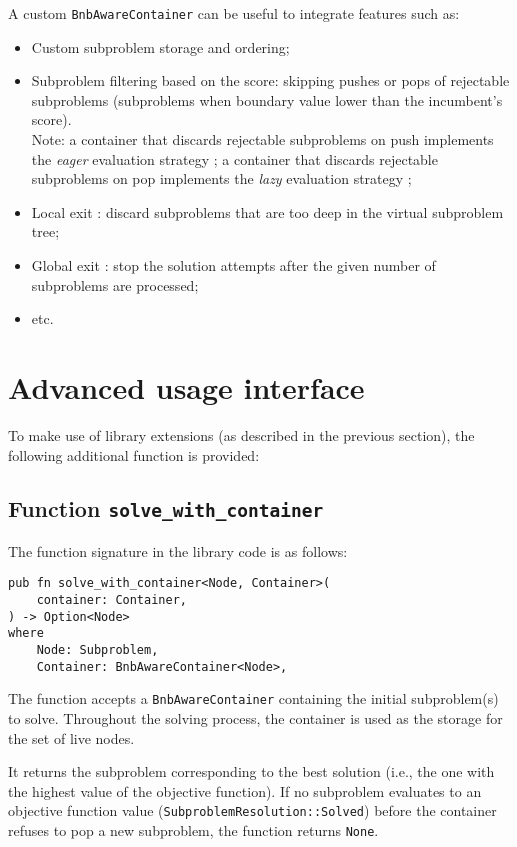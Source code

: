 A custom \texttt{BnbAwareContainer} can be useful to integrate features such as:

\begin{itemize}
 \item Custom subproblem storage and ordering;
 \item Subproblem filtering based on the score: skipping pushes or pops of rejectable
    subproblems (subproblems when boundary value lower than the incumbent's score). \\
    Note: a container that discards rejectable subproblems on push implements the \emph{eager}
    evaluation strategy \cite{clausen1999principles}; a container that discards rejectable
    subproblems on pop implements the \emph{lazy} evaluation strategy
    \cite{clausen1999principles};
 \item Local exit \cite{narkawicz2013formalnasa}: discard subproblems that are too deep in
    the virtual subproblem tree;
 \item Global exit \cite{narkawicz2013formalnasa}: stop the solution attempts after the given
    number of subproblems are processed;
 \item etc.
\end{itemize}

\section{Advanced usage interface}

\label{sec:advanced_usage}

To make use of library extensions (as described in the previous section), the following
additional function is provided:

\subsection{Function \texttt{solve\_with\_container}}

The function signature in the library code is as follows:

\begin{lstlisting}[caption=Function \texttt{solve\_with\_container}]
pub fn solve_with_container<Node, Container>(
    container: Container,
) -> Option<Node>
where
    Node: Subproblem,
    Container: BnbAwareContainer<Node>,
\end{lstlisting}

The function accepts a \texttt{BnbAwareContainer} containing the initial subproblem(s) to
solve. Throughout the solving process, the container is used as the storage for the set of
live nodes.

It returns the subproblem corresponding to the best solution (i.e., the one with the
highest value of the objective function). If no subproblem evaluates to an objective
function value (\texttt{SubproblemResolution::Solved}) before the container refuses to pop
a new subproblem, the function returns \texttt{None}.
